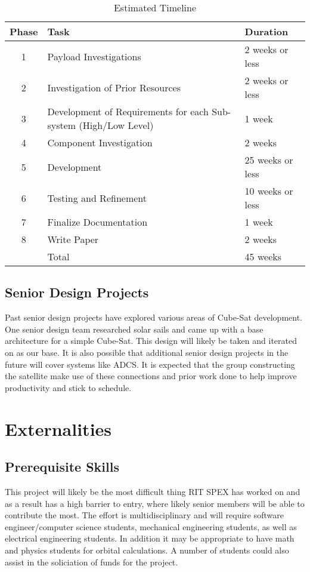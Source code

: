 \documentclass[conference]{IEEEtran} %
\begin{document}
\begin{table}
  \caption{Estimated Timeline}
  \centering
  \begin{tabularx}{\columnwidth}{@{}cXl@{}} \toprule
    Phase & Task & Duration \\ \midrule
    1 & Payload Investigations & 2 weeks or less \\
    2 & Investigation of Prior Resources & 2 weeks or less \\
    3 & Development of Requirements for each Sub-system (High/Low Level) & 1 week \\
    4 & Component Investigation & 2 weeks  \\
    5 & Development & 25 weeks  or less\\
    6 & Testing and Refinement & 10 weeks or less\\
    7 & Finalize Documentation & 1 week\\
    8 & Write Paper & 2 weeks\\ \hline
       & Total  & 45 weeks \\


    \bottomrule
  \end{tabularx}
\label{tab:timeline}
\end{table}

\subsection{Senior Design Projects}
\label{subsec:seniorDesign}
Past senior design projects have explored various areas of Cube-Sat development.  One senior design team researched solar sails and came up with a base architecture for a simple Cube-Sat.  This design will likely be taken and iterated on as our base.  It is also possible that additional senior design projects in the future will cover systems like ADCS.  It is expected that the group constructing the satellite make use of these connections and prior work done to help improve productivity and stick to schedule.

\section{Externalities}
\subsection{Prerequisite Skills}
This project will likely be the most difficult thing RIT SPEX has worked on and as a result has a high barrier to entry, where likely senior members will be able to contribute the most.  The effort is multidisciplinary and will require software engineer/computer science students, mechanical engineering students, as well as electrical engineering students.  In addition it may be appropriate to have math and physics students for orbital calculations.  A number of students could also assist in the soliciation of funds for the project.
\end{document}
